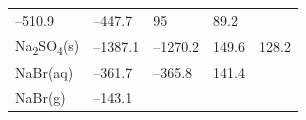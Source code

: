\documentclass[
]{book}
\theoremstyle{definition}
\theoremstyle{definition}
\theoremstyle{definition}
\theoremstyle{remark}
\begin{document}
\begin{longtable}[]{@{}lllll@{}}
\begin{minipage}[t]{0.19\columnwidth}
--510.9\strut
\end{minipage} & \begin{minipage}[t]{0.20\columnwidth}\raggedright
--447.7\strut
\end{minipage} & \begin{minipage}[t]{0.18\columnwidth}\raggedright
95\strut
\end{minipage} & \begin{minipage}[t]{0.18\columnwidth}\raggedright
89.2\strut
\end{minipage}\tabularnewline
\begin{minipage}[t]{0.10\columnwidth}\raggedright
Na\textsubscript{2}SO\textsubscript{4}(s)\strut
\end{minipage} & \begin{minipage}[t]{0.19\columnwidth}\raggedright
--1387.1\strut
\end{minipage} & \begin{minipage}[t]{0.20\columnwidth}\raggedright
--1270.2\strut
\end{minipage} & \begin{minipage}[t]{0.18\columnwidth}\raggedright
149.6\strut
\end{minipage} & \begin{minipage}[t]{0.18\columnwidth}\raggedright
128.2\strut
\end{minipage}\tabularnewline
\begin{minipage}[t]{0.10\columnwidth}\raggedright
NaBr(aq)\strut
\end{minipage} & \begin{minipage}[t]{0.19\columnwidth}\raggedright
--361.7\strut
\end{minipage} & \begin{minipage}[t]{0.20\columnwidth}\raggedright
--365.8\strut
\end{minipage} & \begin{minipage}[t]{0.18\columnwidth}\raggedright
141.4\strut
\end{minipage} & \begin{minipage}[t]{0.18\columnwidth}\raggedright
\strut
\end{minipage}\tabularnewline
\begin{minipage}[t]{0.10\columnwidth}\raggedright
NaBr(g)\strut
\end{minipage} & \begin{minipage}[t]{0.19\columnwidth}\raggedright
--143.1\strut
\end{minipage} & \begin{minipage}[t]{0.20\columnwidth}\raggedright

\end{minipage}
\end{longtable}
\end{document}
